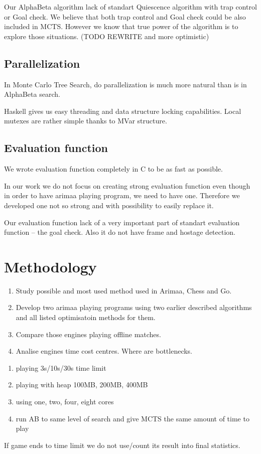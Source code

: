 \documentclass[12pt,titlepage,fleqn]{report}
\begin{document}
Our AlphaBeta algorithm lack of standart Quiescence algorithm with trap control
or Goal check. We believe that both trap control and Goal check could be also
included in MCTS. However we know that true power of the algorithm is to
explore those situations. (TODO REWRITE and more optimistic)

\section{Parallelization}
In Monte Carlo Tree Search, do parallelization is much more natural than is in
AlphaBeta search.

Haskell gives us easy threading and data structure locking capabilities.
Local mutexes are rather simple thanks to MVar structure.

\section{Evaluation function}
We wrote evaluation function completely in C to be as fast as possible.

In our work we do not focus on creating strong evaluation function even though
in order to have arimaa playing program, we need to have one. Therefore we
developed one not so strong and with possibility to easily replace it.

Our evaluation function lack of a very important part of standart evaluation
function -- the goal check.
Also it do not have frame and hostage detection.

\chapter{Methodology}
\begin{enumerate}%
\item Study possible and most used method used in Arimaa, Chess and Go.
\item Develop two arimaa playing programs using two earlier described
	  algorithms and all listed optimisatoin methods for them.
\item Compare those engines playing offline matches.
\item Analise engines time cost centres. Where are bottlenecks.
\end{enumerate}

\begin{enumerate}
\item playing 3s/10s/30s time limit
\item playing with heap 100MB, 200MB, 400MB
\item using one, two, four, eight cores
\item run AB to same level of search and give MCTS the same amount of time to play
\end{enumerate}
If game ends to time limit we do not use/count its result into final statistics.
\end{document}
